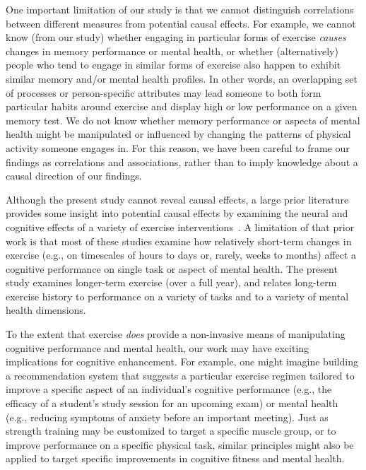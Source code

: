 \documentclass[10pt]{article}
\begin{document}
One important limitation of our study is that we cannot distinguish
correlations between different measures from potential causal
effects.  For example, we cannot know (from our study) whether
engaging in particular forms of exercise \textit{causes} changes in
memory performance or mental health, or whether (alternatively) people
who tend to engage in similar forms of exercise also happen to
exhibit similar memory and/or mental health profiles.  In other words,
an overlapping set of processes or person-specific attributes may lead
someone to both form particular habits around exercise and display high or low performance on a
given memory test.  We do not know whether memory performance or
aspects of mental health might be manipulated or influenced by
changing the patterns of physical activity someone engages in.  For
this reason, we have been careful to frame our findings as
correlations and associations, rather than to imply knowledge about a causal direction
of our findings.

Although the present study cannot reveal causal effects, a large prior
literature provides some insight into potential causal effects by examining the neural and cognitive effects of a variety
of exercise interventions~\citep{ChanEtal15, VidoEtal15, KamiEtal07,
  ImboEtal19, SuwaEtal17, SinhEtal21, Tomp03}.  A limitation of that
prior work is that most of these studies examine how relatively
short-term changes in exercise (e.g., on timescales of hours to days
or, rarely, weeks to months) affect a cognitive performance on single
task or aspect of mental health.  The present study examines
longer-term exercise (over a full year), and relates long-term
exercise history to performance on a variety of tasks and to a variety
of mental health dimensions.

To the extent that exercise \textit{does} provide a non-invasive means
of manipulating cognitive performance and mental health, our work may
have exciting implications for cognitive enhancement.  For example,
one might imagine building a recommendation system that suggests a
particular exercise regimen tailored to improve a specific aspect of
an individual's cognitive performance (e.g., the efficacy of a student's study session for an
upcoming exam) or mental health (e.g., reducing symptoms of anxiety
before an important meeting).  Just as strength training may be
customized to target a specific muscle group, or to improve
performance on a specific physical task, similar principles might also
be applied to target specific improvements in cognitive fitness
and mental health.
\end{document}
